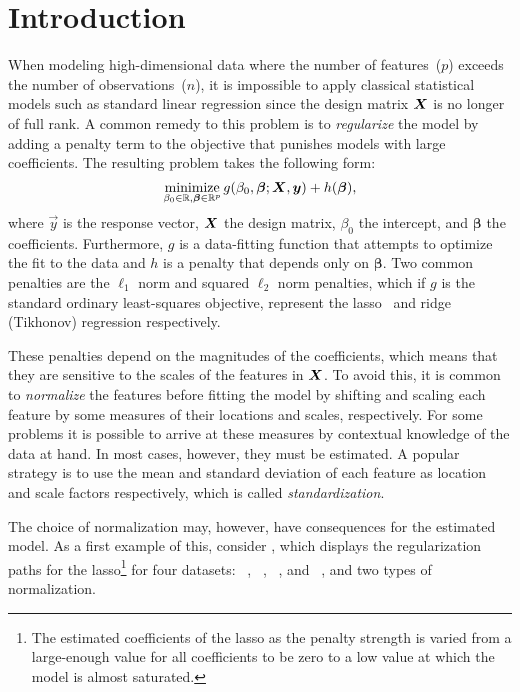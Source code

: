 \section{Introduction}

When modeling high-dimensional data where the number of features~(\(p\)) exceeds the number
of observations~(\(n\)), it is impossible to apply classical statistical models such as
standard linear regression since the design matrix \(\bm X\) is no longer of full rank. A
common remedy to this problem is to \emph{regularize} the model by adding a penalty term to
the objective that punishes models with large coefficients. The resulting problem takes the
following form:
\begin{equation}
  \label{eq:general-objective}
  \operatorname*{minimize}_{\beta_0 \in \mathbb{R},\bm{\beta} \in \mathbb{R}^p} g(\beta_0, \bm{\beta}; \bm X, \bm y) + h(\bm\beta),
\end{equation}
%
where \(\vec y\) is the response vector, \(\bm X\) the design matrix, \(\beta_0\) the
intercept, and \(\bm{\beta}\) the coefficients. Furthermore, \(g\) is a data-fitting
function that attempts to optimize the fit to the data and \(h\) is a penalty that depends
only on \(\bm{\beta}\). Two common penalties are the \(\ell_1\) norm and squared \(\ell_2\)
norm penalties, which if \(g\) is the standard ordinary least-squares objective, represent
the lasso~\citep{tibshirani1996,santosa1986,donoho1994} and ridge (Tikhonov) regression
respectively.

These penalties depend on the magnitudes of the coefficients, which means that they are
sensitive to the scales of the features in \(\bm X\). To avoid this, it is common to
\emph{normalize} the features before fitting the model by shifting and scaling each feature
by some measures of their locations and scales, respectively. For some problems it is
possible to arrive at these measures by contextual knowledge of the data at hand. In most
cases, however, they must be estimated. A popular strategy is to use the mean and standard
deviation of each feature as location and scale factors respectively, which is called
\emph{standardization}.

The choice of normalization may, however, have consequences for the estimated model. As a
first example of this, consider , which displays the
regularization paths for the lasso\footnote{The estimated coefficients of the lasso as the
  penalty strength is varied from a large-enough value for all coefficients to be zero to a
  low value at which the model is almost saturated.} for four datasets:
~\citep{harrison1978}, ~\citep{becker1996,platt1998},
~\citep{king1995,hirst1994}, and ~\citep{platt1998}, and two
types of normalization.

